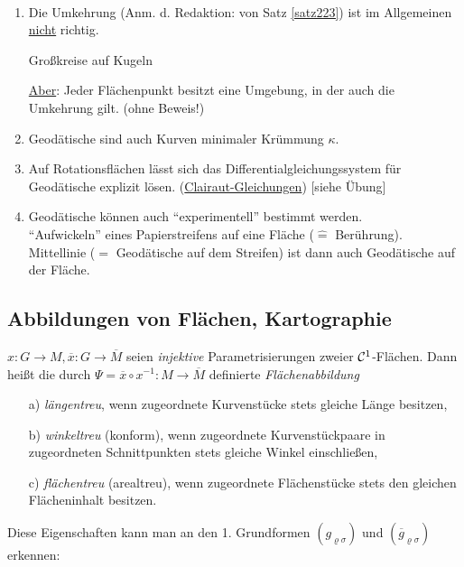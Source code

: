 \begin{bemerkung}\(\)
 \begin{enumerate}
  \item Die Umkehrung (Anm. d. Redaktion: von Satz \ref{satz223}) ist im Allgemeinen \uline{nicht} richtig.
  \begin{bsp}
   Großkreise auf Kugeln
  \end{bsp}
  \uline{Aber}: Jeder Flächenpunkt besitzt eine Umgebung, in der auch die Umkehrung gilt. (ohne Beweis!)
  \item Geodätische sind auch Kurven minimaler Krümmung \(\kappa\).
  \item Auf Rotationsflächen lässt sich das Differentialgleichungssystem für Geodätische explizit lösen. (\uline{Clairaut-Gleichungen}) [siehe Übung]
  \item Geodätische können auch ``experimentell'' bestimmt werden. \\
  ``Aufwickeln'' eines Papierstreifens auf eine Fläche (\(\widehat{=}\) Berührung). Mittellinie (\(=\) Geodätische auf dem Streifen) ist dann auch Geodätische auf der Fläche.
 \end{enumerate}

\end{bemerkung}

\subsection{Abbildungen von Flächen, Kartographie}
\begin{definition}
 \(x \colon G \to M, \overline x\colon G \to \overline M\) seien \textit{injektive} Parametrisierungen zweier \(\mathcal{C}^1\)-Flächen. Dann heißt die durch \(\Psi = \overline x \circ x^{-1}\colon M \to \overline M\) definierte \textit{Flächenabbildung}
 \begin{enumerate}
 \item[a)] \textit{längentreu}, wenn zugeordnete Kurvenstücke stets gleiche Länge besitzen,
 \item[b)] \textit{winkeltreu} (konform), wenn zugeordnete Kurvenstückpaare in zugeordneten Schnittpunkten stets gleiche Winkel einschließen,
 \item[c)] \textit{flächentreu} (arealtreu), wenn zugeordnete Flächenstücke stets den gleichen Flächeninhalt besitzen.      
 \end{enumerate}
\end{definition}

Diese Eigenschaften kann man an den 1. Grundformen \((g_{\varrho \sigma})\) und \((\overline g_{\varrho \sigma})\) erkennen:

